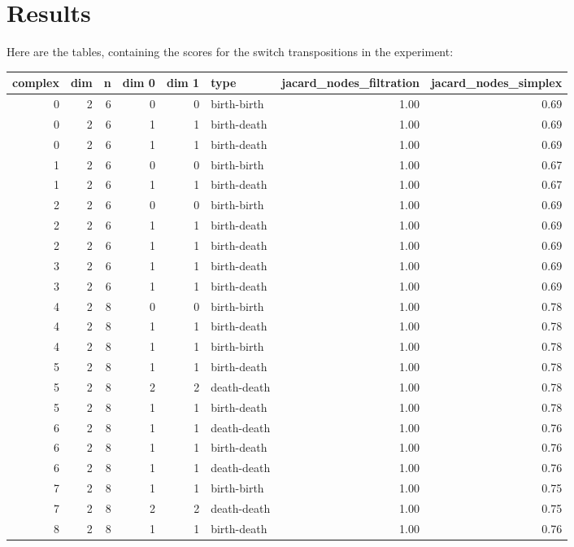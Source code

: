 \documentclass{article}
\begin{document}
\section{Results}

\par Here are the tables, containing the scores for the switch transpositions in the experiment:

\begin{center}
\begin{tabular}{rrrrrlrr}
\toprule
complex & dim & n & dim 0 & dim 1 & type & jacard\_nodes\_filtration & jacard\_nodes\_simplex \\
\midrule
0 & 2 & 6 & 0 & 0 & birth-birth & 1.00 & 0.69 \\
0 & 2 & 6 & 1 & 1 & birth-death & 1.00 & 0.69 \\
0 & 2 & 6 & 1 & 1 & birth-death & 1.00 & 0.69 \\
1 & 2 & 6 & 0 & 0 & birth-birth & 1.00 & 0.67 \\
1 & 2 & 6 & 1 & 1 & birth-death & 1.00 & 0.67 \\
2 & 2 & 6 & 0 & 0 & birth-birth & 1.00 & 0.69 \\
2 & 2 & 6 & 1 & 1 & birth-death & 1.00 & 0.69 \\
2 & 2 & 6 & 1 & 1 & birth-death & 1.00 & 0.69 \\
3 & 2 & 6 & 1 & 1 & birth-death & 1.00 & 0.69 \\
3 & 2 & 6 & 1 & 1 & birth-death & 1.00 & 0.69 \\
4 & 2 & 8 & 0 & 0 & birth-birth & 1.00 & 0.78 \\
4 & 2 & 8 & 1 & 1 & birth-death & 1.00 & 0.78 \\
4 & 2 & 8 & 1 & 1 & birth-birth & 1.00 & 0.78 \\
5 & 2 & 8 & 1 & 1 & birth-death & 1.00 & 0.78 \\
5 & 2 & 8 & 2 & 2 & death-death & 1.00 & 0.78 \\
5 & 2 & 8 & 1 & 1 & birth-death & 1.00 & 0.78 \\
6 & 2 & 8 & 1 & 1 & death-death & 1.00 & 0.76 \\
6 & 2 & 8 & 1 & 1 & birth-death & 1.00 & 0.76 \\
6 & 2 & 8 & 1 & 1 & death-death & 1.00 & 0.76 \\
7 & 2 & 8 & 1 & 1 & birth-birth & 1.00 & 0.75 \\
7 & 2 & 8 & 2 & 2 & death-death & 1.00 & 0.75 \\
8 & 2 & 8 & 1 & 1 & birth-death & 1.00 & 0.76 \\

\end{tabular}
\end{center}
\end{document}
